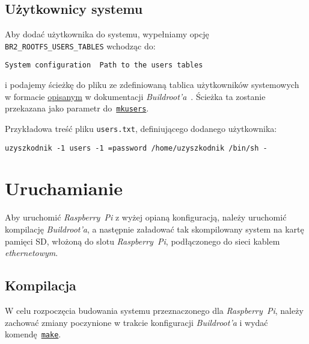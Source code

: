 \documentclass{article}
\begin{document}

\subsection{Użytkownicy systemu}
\label{uzyszkodnik}

Aby dodać użytkownika do systemu, wypełniamy opcję \texttt{BR2\_ROOTFS\_USERS\_TABLES} wchodząc do:

\begin{center}
\texttt{System configuration \textrightarrow\ Path to the users tables}
\end{center}

\noindent i podajemy ścieżkę do pliku ze zdefiniowaną tablica użytkowników systemowych w formacie \href{https://buildroot.org/downloads/manual/manual.html#makeuser-syntax}{opisanym} w dokumentacji \emph{Buildroot'a}~\cite{www:makeuser-syntax}. Ścieżka ta zostanie przekazana jako parametr do~\href{https://github.com/maximeh/buildroot/blob/master/support/scripts/mkusers}{\texttt{mkusers}}.

\noindent Przykładowa treść pliku \texttt{users.txt}, definiującego dodanego użytkownika:

\begin{Verbatim}[frame=single]
uzyszkodnik -1 users -1 =password /home/uzyszkodnik /bin/sh -
\end{Verbatim}


\section{Uruchamianie}

Aby uruchomić \emph{Raspberry~Pi} z wyżej opianą konfiguracją, należy uruchomić kompilację \emph{Buildroot'a}, a następnie załadować tak skompilowany system na kartę pamięci SD, włożoną do slotu \emph{Raspberry~Pi}, podłączonego do sieci kablem \emph{ethernetowym}.

\subsection{Kompilacja}

W celu rozpoczęcia budowania systemu przeznaczonego dla \emph{Raspberry~Pi}, należy zachować zmiany poczynione w trakcie konfiguracji \emph{Buildroot'a} i wydać komendę~\texttt{\href{https://github.com/buildroot/buildroot/blob/master/Makefile}{make}}.
\end{document}
